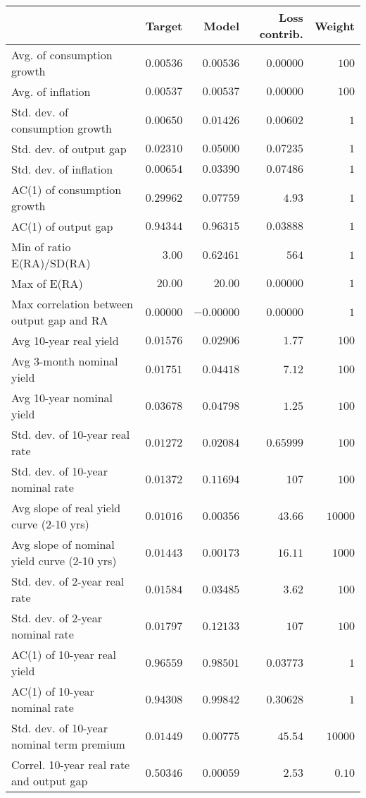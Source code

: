 \begin{tabular}{lrrrr} \hline  & Target & Model & Loss contrib. & Weight \\ \hline Avg. of consumption growth & $0.00536$ & $0.00536$ & $0.00000$ & $100$ \\ Avg. of inflation & $0.00537$ & $0.00537$ & $0.00000$ & $100$ \\ Std. dev. of consumption growth & $0.00650$ & $0.01426$ & $0.00602$ & $1$ \\ Std. dev. of output gap & $0.02310$ & $0.05000$ & $0.07235$ & $1$ \\ Std. dev. of inflation & $0.00654$ & $0.03390$ & $0.07486$ & $1$ \\ AC(1) of consumption growth & $0.29962$ & $0.07759$ & $4.93$ & $1$ \\ AC(1) of output gap & $0.94344$ & $0.96315$ & $0.03888$ & $1$ \\ Min of ratio E(RA)/SD(RA) & $3.00$ & $0.62461$ & $564$ & $1$ \\ Max of E(RA) & $20.00$ & $20.00$ & $0.00000$ & $1$ \\ Max correlation between output gap and RA & $0.00000$ & $-0.00000$ & $0.00000$ & $1$ \\ Avg 10-year real yield & $0.01576$ & $0.02906$ & $1.77$ & $100$ \\ Avg 3-month nominal yield & $0.01751$ & $0.04418$ & $7.12$ & $100$ \\ Avg 10-year nominal yield & $0.03678$ & $0.04798$ & $1.25$ & $100$ \\ Std. dev. of 10-year real rate & $0.01272$ & $0.02084$ & $0.65999$ & $100$ \\ Std. dev. of 10-year nominal rate & $0.01372$ & $0.11694$ & $107$ & $100$ \\ Avg slope of real yield curve (2-10 yrs) & $0.01016$ & $0.00356$ & $43.66$ & $10000$ \\ Avg slope of nominal yield curve (2-10 yrs) & $0.01443$ & $0.00173$ & $16.11$ & $1000$ \\ Std. dev. of 2-year real rate & $0.01584$ & $0.03485$ & $3.62$ & $100$ \\ Std. dev. of 2-year nominal rate & $0.01797$ & $0.12133$ & $107$ & $100$ \\ AC(1) of 10-year real yield & $0.96559$ & $0.98501$ & $0.03773$ & $1$ \\ AC(1) of 10-year nominal rate & $0.94308$ & $0.99842$ & $0.30628$ & $1$ \\ Std. dev. of 10-year nominal term premium & $0.01449$ & $0.00775$ & $45.54$ & $10000$ \\ Correl. 10-year real rate and output gap & $0.50346$ & $0.00059$ & $2.53$ & $0.10$ \\ \hline \end{tabular}